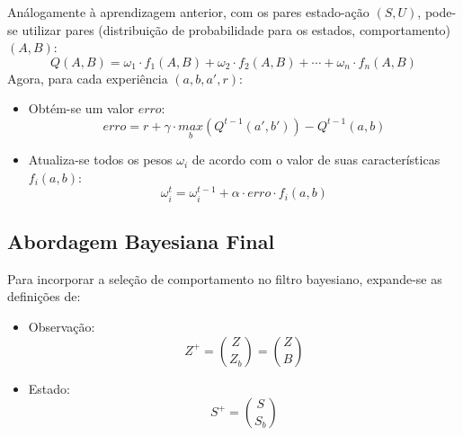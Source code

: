 \documentclass{beamer}
\begin{document}
\begin{frame}
Análogamente à aprendizagem anterior, com os pares estado-ação $ \left( S, U \right) $, pode-se utilizar pares (distribuição de probabilidade para os estados, comportamento) $ \left( A, B \right) $:
$$ Q \left( A, B \right) = \omega_1 \cdot f_1 \left( A, B \right) + \omega_2 \cdot f_2 \left( A, B \right) + \cdots + \omega_n \cdot f_n \left( A, B \right) $$\pause
Agora, para cada experiência $ \left( a, b, a', r \right) $:\pause
\begin{itemize}
	\item Obtém-se um valor $ erro $:
		$$ erro = r + \gamma \cdot \underset{b}{max} \left( Q^{t-1} \left( a', b' \right) \right) - Q^{t-1} \left( a, b \right) $$\pause
	\item Atualiza-se todos os pesos $ \omega_i $ de acordo com o valor de suas características $ f_i \left( a, b \right) $:
		$$ \omega_i^t = \omega_i^{t-1} + \alpha \cdot erro \cdot f_i \left( a, b \right) $$
\end{itemize}
\end{frame}


\subsection{Abordagem Bayesiana Final}

\begin{frame}
Para incorporar a seleção de comportamento no filtro bayesiano, expande-se as definições de:\pause
\begin{itemize}
	\item Observação: $$ Z^+ = \binom{Z}{Z_b} = \binom{Z}{B} $$\pause
	\item Estado: $$ S^+ = \binom{S}{S_b} $$
\end{itemize}
\end{frame}

\end{document}
